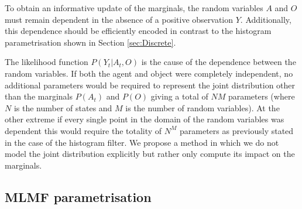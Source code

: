 To obtain an informative update of the marginals, the random variables $A$ and $O$ must remain 
dependent in the absence of a positive observation $Y$. Additionally, this dependence should be efficiently encoded in contrast to the
histogram parametrisation shown in Section \ref{sec:Discrete}. 

The likelihood function $P(Y_t|A_t,O)$ is the cause of the dependence between the random variables. If both the agent and object 
were completely independent, no additional parameters would be required to represent the joint distribution other than the marginals 
$P(A_t)$ and $P(O)$ giving a total of $N M$ parameters (where $N$ is the number of states and $M$ is the number of random variables). 
At the other extreme if every single point in the domain of the random variables was dependent this would require the totality 
of $N^M$ parameters as previously stated in the case of the histogram filter. We propose a method in which we do not model the joint
distribution explicitly but rather only compute its impact on the marginals. 

\subsection{MLMF parametrisation}




